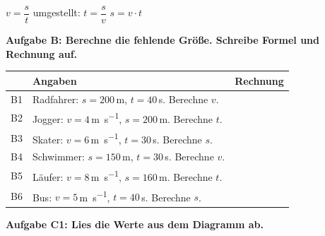 \documentclass[11pt,a4paper]{article}
\newcommand{\aufgabe}[1]{\noindent\textbf{\textcolor{fachfarbe}{#1}}}
\begin{document}
\vspace{0.6em}

\begin{merkkasten}[title=Formel: Geschwindigkeit]
\begin{center}
{\large $v = \dfrac{s}{t}$} \qquad umgestellt: \quad $t = \dfrac{s}{v}$ \qquad $s = v \cdot t$
\end{center}
\end{merkkasten}

\vspace{0.4em}

\aufgabe{Aufgabe B: Berechne die fehlende Größe. Schreibe Formel und Rechnung auf.}

\vspace{0.3em}
{\small
\renewcommand{\arraystretch}{1}
\begin{tabular}{|c|p{8cm}|p{6.5cm}|}
\hline
& \textbf{Angaben} & \textbf{Rechnung} \\
\hline
B1 & Radfahrer: $s = 200$\,m, $t = 40$\,s. Berechne $v$. & \\[1.2cm]
\hline
B2 & Jogger: $v = 4$\,\si{\metre\per\second}, $s = 200$\,m. Berechne $t$. & \\[1.2cm]
\hline
B3 & Skater: $v = 6$\,\si{\metre\per\second}, $t = 30$\,s. Berechne $s$. & \\[1.2cm]
\hline
B4 & Schwimmer: $s = 150$\,m, $t = 30$\,s. Berechne $v$. & \\[1.2cm]
\hline
B5 & Läufer: $v = 8$\,\si{\metre\per\second}, $s = 160$\,m. Berechne $t$. & \\[1.2cm]
\hline
B6 & Bus: $v = 5$\,\si{\metre\per\second}, $t = 40$\,s. Berechne $s$. & \\[1.2cm]
\hline
\end{tabular}
}

\vspace{0.6em}

\aufgabe{Aufgabe C1: Lies die Werte aus dem Diagramm ab.}
\end{document}
